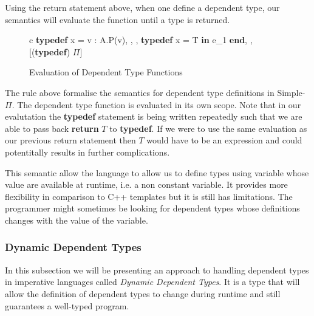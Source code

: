 \documentclass[a4paper,12pt]{report}
\begin{document}
\par
Using the return statement above, when one define a dependent type, our 
semantics will evaluate the function until a type is returned. 

\begin{figure}[H]
  \begin{center}
    \begin{tabular} {c}
      {\langle\textbf{typedef } x = \Pi v : A.P(v), 
      \sigma, \rho, \tau \rangle \longrightarrow 
        \langle \textbf{typedef } x = T \textbf{ in }e_1\textbf{ end}, \sigma, \tau \rangle}[(\textbf{typedef}) $\Pi$]  
    \end{tabular}
  \end{center}
  \caption{Evaluation of Dependent Type Functions}
\end{figure}

\par 
The rule above formalise the semantics for dependent type definitions in 
Simple-$\Pi$. The dependent type function is evaluated in its own scope. Note 
that in our evalutation the \textbf{typedef} statement is being written 
repeatedly such that we are able to pass back \textbf{return} $T$ to 
\textbf{typedef}. If we were to use the same evaluation as our previous return 
statement then $T$ would have to be an expression and could potentitally results 
in further complications. 

\par
This semantic allow the language to allow us to define types using variable 
whose value are available at runtime, i.e. a non constant variable. It provides 
more flexibility in comparison to C++ templates but it is still has limitations. The 
programmer might sometimes be looking for dependent types whose definitions 
changes with the value of the variable. 

\subsubsection{Dynamic Dependent Types}
In this subsection we will be presenting an approach to handling dependent types 
in imperative languages called \textit{Dynamic Dependent Types}. It is a type 
that will allow the definition of dependent types to change during runtime and 
still guarantees a well-typed program. 
\end{document}
